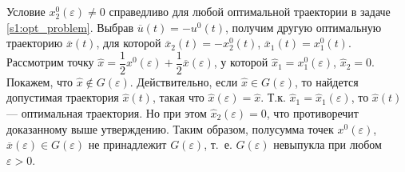 \documentclass[../main.tex]{subfiles}
\begin{document}
Условие $ x_2^0(\varepsilon) \neq 0 $ справедливо для любой оптимальной траектории в задаче \eqref{s1:opt_problem}. 
Выбрав $ \overline{u}(t) = -u^0(t) $, получим другую оптимальную траекторию $ \overline{x}(t) $, для которой $ \overline{x}_2(t) = -x_2^0(t) $, $ \overline{x}_1(t) = x_1^0(t) $.
Рассмотрим точку $ \hat{x} = \dfrac{1}{2}x^0(\varepsilon) + \dfrac{1}{2}\overline{x}(\varepsilon) $, у которой $ \hat{x}_1 = x_1^0(\varepsilon) $, $ \hat{x}_2 = 0 $. 
Покажем, что $ \hat{x} \notin G(\varepsilon) $. 
Действительно, если $ \hat{x} \in G(\varepsilon) $, то найдется допустимая траектория $ \hat{x}(t) $, такая что $ \hat{x}(\varepsilon) = \hat{x} $. 
Т.к. $ \hat{x}_1 = \hat{x}_1(\varepsilon) $, то $ \hat{x}(t) $ --- оптимальная траектория. 
Но при этом $ \hat{x}_2(\varepsilon) = 0 $, что противоречит доказанному выше утверждению. 
Таким образом, полусумма точек $ x^0(\varepsilon) $, $ \overline{x}(\varepsilon) \in G(\varepsilon) $ не принадлежит $ G(\varepsilon) $, т.~е. $ G(\varepsilon) $ невыпукла при любом $ \varepsilon > 0 $.




 
\end{document}
